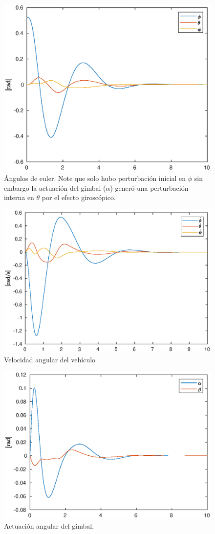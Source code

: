 \begin{figure}[!ht]
    \centering
    \includegraphics[width=0.6\linewidth]{fig/eulerang_edf}
    \caption{Ángulos de euler. Note que solo hubo perturbación inicial en $\phi$ sin embargo la actuación del gimbal ($\alpha$) generó una perturbación interna en $\theta$ por el efecto giroscópico.}
    \label{fig:eulerang_edf}
\end{figure}

\begin{figure}[!ht]
    \centering
    \includegraphics[width=0.6\linewidth]{fig/angvel_edf.eps}
    \caption{Velocidad angular del vehículo}
    \label{fig:angvel_edf.eps}
\end{figure}

\begin{figure}[!ht]
    \centering
    \includegraphics[width=0.6\linewidth]{fig/actuator_edf}
    \caption{Actuación angular del gimbal.}
    \label{fig:actuator_edf}
\end{figure}

